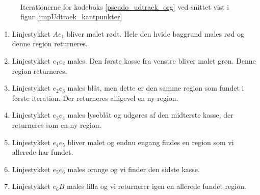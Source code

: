 {\begin{figure}[!p]
    \\
    \hspace{1em}
        \caption[]{Iterationerne for kodeboks \ref{pseudo_udtraek_org}
        ved snittet vist i figur \ref{impUdtraek_kantpunkter}}
    \label{region_extract}
\end{figure}
\begin{enumerate}
    \item Linjestykket $Ae_1$ bliver malet rødt. Hele den hvide baggrund
        males rød og denne region returneres.
    \item Linjestykket $e_1e_2$ males. Den første kasse fra venstre
        bliver malet grøn. Denne region returneres.
    \item Linjestykket $e_2e_3$ males blåt, men dette er den samme region som
        fundet i første iteration. Der returneres alligevel en ny
        region.
    \item Linjestykket $e_3e_4$ males lyseblåt og udgøres af den
        midterste kasse, der returneres som en ny region.
    \item Linjestykket $e_4e_5$ bliver malet og endnu engang findes en
        region som vi allerede har fundet.
    \item Linjestykket $e_5e_6$ males orange og vi finder den sidste
        kasse.
    \item Linjestykket $e_6B$ males lilla og vi returnerer igen en
        allerede fundet region.
\end{enumerate}

}
